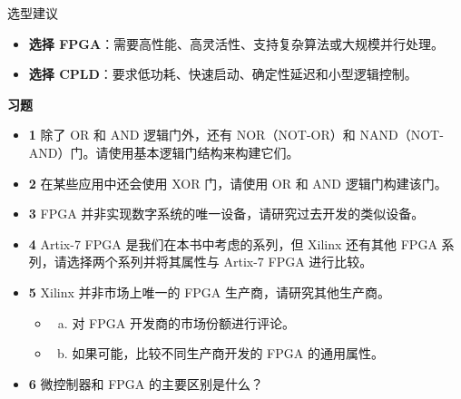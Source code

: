 \documentclass[
  ignorenonframetext,
  chinese,
]{beamer}
\providecommand{\tightlist}{%
  \setlength{\itemsep}{0pt}\setlength{\parskip}{0pt}}
\begin{document}
\begin{frame}
\begin{block}{选型建议}
\label{ux9009ux578bux5efaux8bae}
\begin{itemize}
\tightlist
\item
  \textbf{选择
  FPGA}：需要高性能、高灵活性、支持复杂算法或大规模并行处理。\\
\item
  \textbf{选择 CPLD}：要求低功耗、快速启动、确定性延迟和小型逻辑控制。
\end{itemize}
\end{block}

\begin{block}{\textbf{习题}}
\label{ux4e60ux9898}
\begin{itemize}
\tightlist
\item
  \textbf{1} 除了 OR 和 AND 逻辑门外，还有 NOR（NOT-OR）和
  NAND（NOT-AND）门。请使用基本逻辑门结构来构建它们。
\item
  \textbf{2} 在某些应用中还会使用 XOR 门，请使用 OR 和 AND
  逻辑门构建该门。
\item
  \textbf{3} FPGA 并非实现数字系统的唯一设备，请研究过去开发的类似设备。
\item
  \textbf{4} Artix-7 FPGA 是我们在本书中考虑的系列，但 Xilinx 还有其他
  FPGA 系列，请选择两个系列并将其属性与 Artix-7 FPGA 进行比较。
\item
  \textbf{5} Xilinx 并非市场上唯一的 FPGA 生产商，请研究其他生产商。

  \begin{itemize}
  \tightlist
  \item
    \begin{enumerate}
    [a.]
    \tightlist
    \item
      对 FPGA 开发商的市场份额进行评论。
    \end{enumerate}
  \item
    \begin{enumerate}
    [a.]
    \setcounter{enumi}{1}
    \tightlist
    \item
      如果可能，比较不同生产商开发的 FPGA 的通用属性。
    \end{enumerate}
  \end{itemize}
\item
  \textbf{6} 微控制器和 FPGA 的主要区别是什么？
\end{itemize}
\end{block}
\end{frame}
\end{document}
